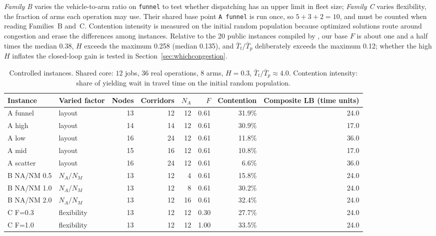 \documentclass[preprint,review,12pt,authoryear]{elsarticle}
\newcommand{\NCases}{10}
\newcommand{\PubFMed}{0.38}              %
\newcommand{\PubHMed}{0.135}             %
\newcommand{\PubHMax}{0.258}             %
\newcommand{\PubTtTpHi}{0.12}            %
\newcommand{\PubNInst}{20}
\begin{document}
\emph{Family B} varies the vehicle-to-arm ratio on \texttt{funnel} to test whether dispatching has an upper limit in fleet size; \emph{Family C} varies flexibility, the fraction of arms each operation may use.
Their shared base point \texttt{A funnel} is run once, so $5+3+2=\NCases$, and must be counted when reading Families~B and~C.
Contention intensity is measured on the initial random population because optimized solutions route around congestion and erase the differences among instances.
Relative to the \PubNInst{} public instances compiled by \citet{homayouni2021production}, our base $F$ is about one and a half times the median \PubFMed{}, $H$ exceeds the maximum \PubHMax{} (median \PubHMed{}), and $\bar{T}_t/\bar{T}_p$ deliberately exceeds the maximum \PubTtTpHi{}; whether the high $H$ inflates the closed-loop gain is tested in Section~\ref{sec:whichcongestion}.

\begin{table}[!htbp]
\caption{Controlled instances. Shared core: $12$ jobs, $36$ real operations, $8$ arms, $H=0.3$, $\bar{T}_t/\bar{T}_p\approx4.0$.
Contention intensity: share of yielding wait in travel time on the initial random population.}
\label{tab:instances}
\small
\begin{adjustbox}{max width=\linewidth}\begin{tabular}{@{}llrrrrrr@{}}
\toprule
Instance & Varied factor & Nodes & Corridors & $N_A$ & $F$ & Contention & Composite LB (time units) \\
\midrule
A funnel & layout & 13 & 12 & 12 & 0.61 & 31.9\% & 24.0 \\
A high & layout & 14 & 14 & 12 & 0.61 & 30.9\% & 17.0 \\
A low & layout & 16 & 24 & 12 & 0.61 & 11.8\% & 36.0 \\
A mid & layout & 15 & 16 & 12 & 0.61 & 10.8\% & 17.0 \\
A scatter & layout & 16 & 24 & 12 & 0.61 & 6.6\% & 36.0 \\
\midrule
B NA/NM 0.5 & $N_A/N_M$ & 13 & 12 & 4 & 0.61 & 15.8\% & 24.0 \\
B NA/NM 1.0 & $N_A/N_M$ & 13 & 12 & 8 & 0.61 & 30.2\% & 24.0 \\
B NA/NM 2.0 & $N_A/N_M$ & 13 & 12 & 16 & 0.61 & 32.4\% & 24.0 \\
\midrule
C F=0.3 & flexibility & 13 & 12 & 12 & 0.30 & 27.7\% & 24.0 \\
C F=1.0 & flexibility & 13 & 12 & 12 & 1.00 & 33.5\% & 24.0 \\
\bottomrule
\end{tabular}\end{adjustbox}
\end{table}
\end{document}
